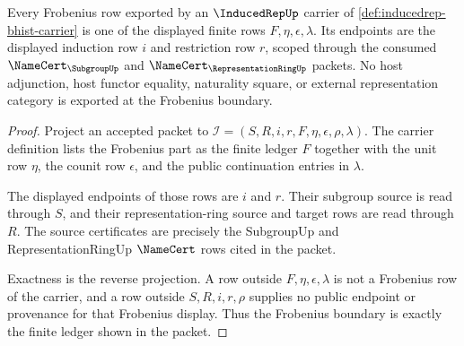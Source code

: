 \begin{theorem}
\label{thm:inducedrep-frobenius-ledger-boundary}
Every Frobenius row exported by an $\InducedRepUp$ carrier of
\autoref{def:inducedrep-bhist-carrier} is one of the displayed finite rows
$F,\eta,\epsilon,\lambda$. Its endpoints are the displayed induction row $i$
and restriction row $r$, scoped through the consumed
$\NameCert_{\SubgroupUp}$ and $\NameCert_{\RepresentationRingUp}$ packets.
No host adjunction, host functor equality, naturality square, or external
representation category is exported at the Frobenius boundary.
\end{theorem}
\begin{proof}
Project an accepted packet to
$\mathcal{I}=(S,R,i,r,F,\eta,\epsilon,\rho,\lambda)$. The carrier definition
lists the Frobenius part as the finite ledger $F$ together with the unit row
$\eta$, the counit row $\epsilon$, and the public continuation entries in
$\lambda$.

The displayed endpoints of those rows are $i$ and $r$. Their subgroup source
is read through $S$, and their representation-ring source and target rows are
read through $R$. The source certificates are precisely the SubgroupUp and
RepresentationRingUp $\NameCert$ rows cited in the packet.

Exactness is the reverse projection. A row outside
$F,\eta,\epsilon,\lambda$ is not a Frobenius row of the carrier, and a row
outside $S,R,i,r,\rho$ supplies no public endpoint or provenance for that
Frobenius display. Thus the Frobenius boundary is exactly the finite ledger
shown in the packet.
\end{proof}

